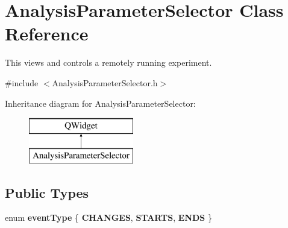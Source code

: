 \hypertarget{class_analysis_parameter_selector}{\section{Analysis\-Parameter\-Selector Class Reference}
\label{class_analysis_parameter_selector}
}


This views and controls a remotely running experiment.  




{\ttfamily \#include $<$Analysis\-Parameter\-Selector.\-h$>$}

Inheritance diagram for Analysis\-Parameter\-Selector\-:\begin{figure}[H]
\begin{center}
\leavevmode
\includegraphics[height=2.000000cm]{class_analysis_parameter_selector}
\end{center}
\end{figure}
\subsection*{Public Types}
\begin{DoxyCompactItemize}
\item 
enum {\bfseries event\-Type} \{ {\bfseries C\-H\-A\-N\-G\-E\-S}, 
{\bfseries S\-T\-A\-R\-T\-S}, 
{\bfseries E\-N\-D\-S}
 \}
\end{DoxyCompactItemize}

